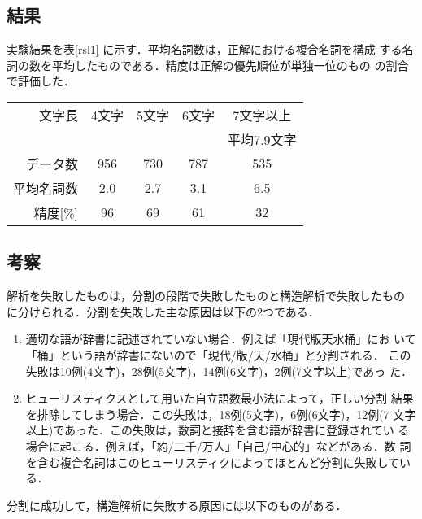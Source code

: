 \subsection{結果}
\label{sec:rsl1}

実験結果を表\ref{rsl1} に示す．平均名詞数は，正解における複合名詞を構成
する名詞の数を平均したものである．精度は正解の優先順位が単独一位のもの
の割合で評価した．

\begin{center}
  \begin{tabular}{|r|c|c|c|c|}
    \hline
    文字長 & 4文字 & 5文字 & 6文字 & 7文字以上\\
    &&&&平均7.9文字\\
    \hline
    データ数 & 956 & 730 & 787 & 535 \\
    \hline
    平均名詞数 & 2.0 & 2.7 & 3.1 & 6.5\\
    \hline
    精度[\%] & 96 & 69 & 61 & 32 \\
    \hline
  \end{tabular}
\end{center}

\subsection{考察}
\label{sec:resul-discuss1}

解析を失敗したものは，分割の段階で失敗したものと構造解析で失敗したもの
に分けられる．分割を失敗した主な原因は以下の2つである．

\begin{enumerate}
\item 適切な語が辞書に記述されていない場合．例えば「現代版天水桶」にお 
いて「桶」という語が辞書にないので「現代/版/天/水桶」と分割される．
この失敗は10例(4文字)，28例(5文字)，14例(6文字)，2例(7文字以上)であっ
た．
\item ヒューリスティクスとして用いた自立語数最小法によって，正しい分割
結果を排除してしまう場合．この失敗は，18例(5文字)，6例(6文字)，12例(7
文字以上)であった．この失敗は，数詞と接辞を含む語が辞書に登録されてい
る場合に起こる．例えば，「約/二千/万人」「自己/中心的」などがある．数
詞を含む複合名詞はこのヒューリスティクによってほとんど分割に失敗してい
る．
\end{enumerate}

分割に成功して，構造解析に失敗する原因には以下のものがある．

